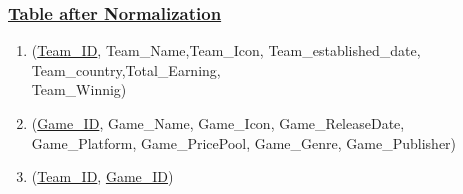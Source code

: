 \subsubsection*{\underline{Table after Normalization}}
\begin{enumerate}
    \item (\underline{Team\_ID}, Team\_Name,Team\_Icon, Team\_established\_date, Team\_country,Total\_Earning,\\Team\_Winnig)
    \item (\underline{Game\_ID}, Game\_Name, Game\_Icon, Game\_ReleaseDate, Game\_Platform, Game\_PricePool, Game\_Genre, Game\_Publisher)
    \item (\underline{Team\_ID}, \underline{Game\_ID})
\end{enumerate}
\clearpage